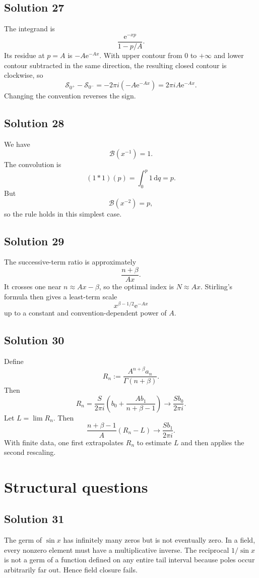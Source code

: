 \documentclass[11pt,openany]{book}
\theoremstyle{plain}
\theoremstyle{definition}
\theoremstyle{remark}
\newcommand{\Borel}{\mathcal{B}}
\newcommand{\dd}{\,\mathrm{d}}
\newcommand{\e}{\mathrm{e}}
\begin{document}
\subsection*{Solution 27}
The integrand is
\[
 \frac{\e^{-xp}}{1-p/A}.
\]
Its residue at $p=A$ is $-A\e^{-Ax}$. With upper contour from $0$ to $+\infty$ and lower contour subtracted in the same direction, the resulting closed contour is clockwise, so
\[
 \mathscr S_{0^+}-\mathscr S_{0^-}
 =-2\pi i(-A\e^{-Ax})
 =2\pi iA\e^{-Ax}.
\]
Changing the convention reverses the sign.

\subsection*{Solution 28}
We have
\[
 \Borel(x^{-1})=1.
\]
The convolution is
\[
 (1*1)(p)=\int_0^p1\dd q=p.
\]
But
\[
 \Borel(x^{-2})=p,
\]
so the rule holds in this simplest case.

\subsection*{Solution 29}
The successive-term ratio is approximately
\[
 \frac{n+\beta}{Ax}.
\]
It crosses one near $n\approx Ax-\beta$, so the optimal index is $N\approx Ax$. Stirling's formula then gives a least-term scale
\[
 x^{\beta-1/2}\e^{-Ax}
\]
up to a constant and convention-dependent power of $A$.

\subsection*{Solution 30}
Define
\[
 R_n:=\frac{A^{n+\beta}a_n}{\Gamma(n+\beta)}.
\]
Then
\[
 R_n=\frac{S}{2\pi i}\left(
 b_0+\frac{Ab_1}{n+\beta-1}\right)
 \longrightarrow \frac{Sb_0}{2\pi i}.
\]
Let $L=\lim R_n$. Then
\[
 \frac{n+\beta-1}{A}(R_n-L)
 \longrightarrow \frac{Sb_1}{2\pi i}.
\]
With finite data, one first extrapolates $R_n$ to estimate $L$ and then applies the second rescaling.

\section{Structural questions}

\subsection*{Solution 31}
The germ of $\sin x$ has infinitely many zeros but is not eventually zero. In a field, every nonzero element must have a multiplicative inverse. The reciprocal $1/\sin x$ is not a germ of a function defined on any entire tail interval because poles occur arbitrarily far out. Hence field closure fails.
\end{document}
